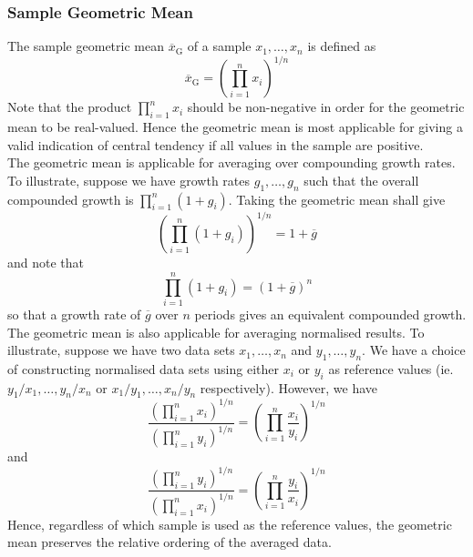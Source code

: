 \documentclass[11pt]{report} %
\begin{document}
\subsubsection{Sample Geometric Mean}

The sample geometric mean $\overline{x}_{\mathrm{G}}$ of a sample $x_{1}, \dots, x_{n}$ is defined as
\begin{equation}
\overline{x}_{\mathrm{G}} = \left(\prod_{i = 1}^{n}x_{i}\right)^{1/n}
\end{equation}
Note that the product $\prod_{i = 1}^{n}x_{i}$ should be non-negative in order for the geometric mean to be real-valued. Hence the geometric mean is most applicable for giving a valid indication of central tendency if all values in the sample are positive. \\

The geometric mean is applicable for averaging over compounding growth rates. To illustrate, suppose we have growth rates $g_{1}, \dots, g_{n}$ such that the overall compounded growth is $\prod_{i = 1}^{n}\left(1 + g_{i}\right)$. Taking the geometric mean shall give
\begin{equation}
\left(\prod_{i = 1}^{n}\left(1 + g_{i}\right)\right)^{1/n} = 1 + \overline{g}
\end{equation}
and note that
\begin{equation}
\prod_{i = 1}^{n}\left(1 + g_{i}\right) = \left(1 + \overline{g}\right)^{n}
\end{equation}
so that a growth rate of $\overline{g}$ over $n$ periods gives an equivalent compounded growth. \\

The geometric mean is also applicable for averaging normalised results. To illustrate, suppose we have two data sets $x_{1}, \dots, x_{n}$ and $y_{1}, \dots, y_{n}$. We have a choice of constructing normalised data sets using either $x_{i}$ or $y_{i}$ as reference values (ie. $y_{1}/x_{1}, \dots, y_{n}/x_{n}$ or $x_{1}/y_{1}, \dots, x_{n}/y_{n}$ respectively). However, we have
\begin{equation}
\dfrac{\left(\prod_{i = 1}^{n}x_{i}\right)^{1/n}}{\left(\prod_{i = 1}^{n}y_{i}\right)^{1/n}} = \left(\prod_{i = 1}^{n}\dfrac{x_{i}}{y_{i}}\right)^{1/n}
\end{equation}
and
\begin{equation}
\dfrac{\left(\prod_{i = 1}^{n}y_{i}\right)^{1/n}}{\left(\prod_{i = 1}^{n}x_{i}\right)^{1/n}} = \left(\prod_{i = 1}^{n}\dfrac{y_{i}}{x_{i}}\right)^{1/n}
\end{equation}
Hence, regardless of which sample is used as the reference values, the geometric mean preserves the relative ordering of the averaged data.
\end{document}
